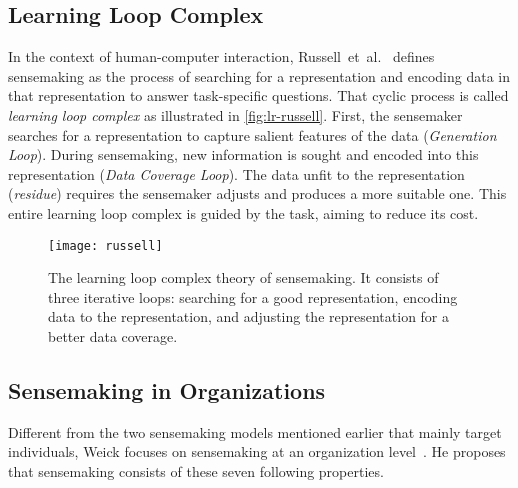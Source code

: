 \subsection{Learning Loop Complex}
In the context of human-computer interaction, Russell~et~al.~\cite{Russell1993} defines sensemaking as the process of searching for a representation and encoding data in that representation to answer task-specific questions. That cyclic process is called \emph{learning loop complex} as illustrated in \autoref{fig:lr-russell}. First, the sensemaker searches for a representation to capture salient features of the data (\emph{Generation Loop}). During sensemaking, new information is sought and encoded into this representation (\emph{Data Coverage Loop}). The data unfit to the representation (\emph{residue}) requires the sensemaker adjusts and produces a more suitable one. This entire learning loop complex is guided by the task, aiming to reduce its cost.

\begin{figure}[!htb]
	\centering
	\texttt{[image: russell]}
	\caption{The learning loop complex theory of sensemaking. It consists of three iterative loops: searching for a good representation, encoding data to the representation, and adjusting the representation for a better data coverage. }
	\label{fig:lr-russell}
\end{figure}

\subsection{Sensemaking in Organizations}
Different from the two sensemaking models mentioned earlier that mainly target individuals, Weick focuses on sensemaking at an organization level~\cite{Weick1995}. He proposes that sensemaking consists of these seven following properties.

